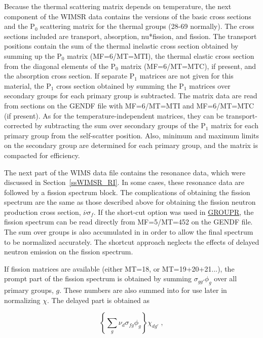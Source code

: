 Because the thermal scattering matrix depends on temperature,
the next component of the WIMSR data contains the 
versions of the basic cross sections and the P$_0$ scattering matrix
for the thermal groups (28-69 normally).  The cross sections
included are transport, absorption, nu*fission, and fission.
The transport positions contain the sum of the thermal inelastic
cross section obtained by summing up the P$_0$ matrix (MF=6/MT=MTI),
the thermal elastic cross section from the diagonal elements of
the P$_0$ matrix (MF=6/MT=MTC), if present, and the absorption cross
section.  If separate P$_1$ matrices are not given for this material,
the P$_1$ cross section obtained by summing the P$_1$ matrices over
secondary groups for each primary group is subtracted.  The matrix
data are read from sections on the GENDF file with MF=6/MT=MTI and
MF=6/MT=MTC (if present).  As for the temperature-independent
matrices, they can be transport-corrected by subtracting the
sum over secondary groups of the P$_1$ matrix for each primary group
from the self-scatter position.  Also, minimum and maximum limits
on the secondary group are determined for each primary group, and the
matrix is compacted for efficiency.

The next part of the WIMS data file contains the resonance data,
which were discussed in Section~\ref{ssWIMSR_RI}.  In some
cases, these resonance data are followed by a fission spectrum
block.  The complications of obtaining the fission spectrum are the
same as those described above for obtaining the fission neutron
production cross section, $\overline{\nu}\sigma_f$.  If the short-cut
option was used in \hyperlink{sGROUPRhy}{GROUPR}, the
fission spectrum can be read directly
from MF=5/MT=452 on the GENDF file.  The sum over groups is also
accumulated in  in order to allow the final spectrum
to be normalized accurately.  The shortcut approach neglects the
effects of delayed neutron emission on the fission spectrum.

If fission matrices are available (either MT=18, or MT=19+20+21...),
the prompt part of the fission spectrum is obtained by summing
$\sigma_{gg'}\phi_g$ over all primary groups, $g$.  These numbers are
also summed into  for use later in normalizing $\chi$.
The delayed part is obtained as

\begin{equation}
 \left\{ \sum_g \nu_d \sigma_{fg} \phi_g \right\} \chi_{dg'} \;,
\end{equation}

